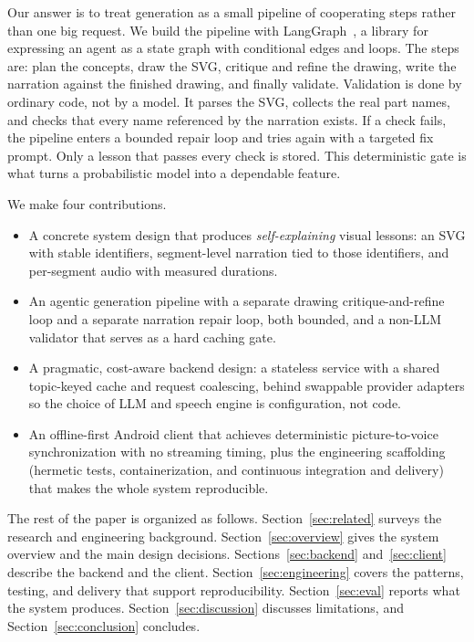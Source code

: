 \documentclass[conference]{IEEEtran}
\begin{document}
Our answer is to treat generation as a small pipeline of cooperating steps
rather than one big request. We build the pipeline with
LangGraph~\cite{langgraph}, a library for expressing an agent as a state graph
with conditional edges and loops. The steps are: plan the concepts, draw the
SVG, critique and refine the drawing, write the narration against the finished
drawing, and finally validate. Validation is done by ordinary code, not by a
model. It parses the SVG, collects the real part names, and checks that every
name referenced by the narration exists. If a check fails, the pipeline enters
a bounded repair loop and tries again with a targeted fix prompt. Only a lesson
that passes every check is stored. This deterministic gate is what turns a
probabilistic model into a dependable feature.

We make four contributions.
\begin{itemize}
  \item A concrete system design that produces \emph{self-explaining} visual
        lessons: an SVG with stable identifiers, segment-level narration tied
        to those identifiers, and per-segment audio with measured durations.
  \item An agentic generation pipeline with a separate drawing
        critique-and-refine loop and a separate narration repair loop, both
        bounded, and a non-LLM validator that serves as a hard caching gate.
  \item A pragmatic, cost-aware backend design: a stateless service with a
        shared topic-keyed cache and request coalescing, behind swappable
        provider adapters so the choice of LLM and speech engine is
        configuration, not code.
  \item An offline-first Android client that achieves deterministic
        picture-to-voice synchronization with no streaming timing, plus the
        engineering scaffolding (hermetic tests, containerization, and
        continuous integration and delivery) that makes the whole system
        reproducible.
\end{itemize}

The rest of the paper is organized as follows. Section~\ref{sec:related}
surveys the research and engineering background. Section~\ref{sec:overview}
gives the system overview and the main design decisions.
Sections~\ref{sec:backend} and~\ref{sec:client} describe the backend and the
client. Section~\ref{sec:engineering} covers the patterns, testing, and
delivery that support reproducibility. Section~\ref{sec:eval} reports what the
system produces. Section~\ref{sec:discussion} discusses limitations, and
Section~\ref{sec:conclusion} concludes.
\end{document}
